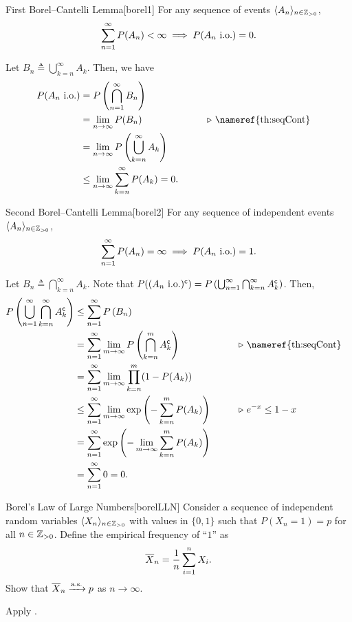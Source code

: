 \documentclass[../probability.tex]{subfiles}
\begin{document}
\begin{Theorem}{First Borel--Cantelli Lemma}[borel1]
    For any sequence of events \(\lang A_n \rang_{n \in \ZZ_{>0}}\),
    \[
        \sum_{n=1}^\infty P(A_n) < \infty
        \implies P(A_n\text{ i.o.}) = 0\text.
    \]
\end{Theorem}
\begin{myproof}[Proof]
    Let \(B_n \triangleq \bigcup_{k=n}^\infty A_k\).
    Then, we have
    \begin{alignat*}{2}
        P(A_n\text{ i.o.})
        &= P \left( \bigcap_{n=1}^\infty B_n \right) \\
        &= \lim_{n\to\infty} P(B_n) &\qquad& \comment{\nameref{th:seqCont}} \\
        &= \lim_{n \to \infty} P \left( \bigcup_{k=n}^\infty A_k\right) \\
        &\le \lim_{n \to \infty} \sum_{k=n}^\infty P(A_k) = 0\text.
    \end{alignat*}
\end{myproof}

\begin{Theorem}{Second Borel--Cantelli Lemma}[borel2]
    For any sequence of independent events \(\lang A_n \rang_{n \in \ZZ_{>0}}\),
    \[
        \sum_{n=1}^\infty P(A_n) = \infty
        \implies P(A_n\text{ i.o.}) = 1\text.
    \]
\end{Theorem}
\begin{myproof}[Proof]
    Let \(B_n \triangleq \bigcap_{k=n}^\infty A_k\).
    Note that \(P((A_n\text{ i.o.})^{\mathsf{c}}) = P \left( \bigcup_{n=1}^\infty \bigcap_{k=n}^\infty
    A_k^{\mathsf{c}} \right)\).
    Then,
    \begin{alignat*}{2}
        P \left( \bigcup_{n=1}^\infty \bigcap_{k=n}^\infty A_k^\cmpl \right)
        &\le \sum_{n=1}^\infty P \left( B_n \right) &\qquad \\
        &= \sum_{n=1}^\infty \lim_{m \to \infty} P \left( \bigcap_{k=n}^m A_k^\cmpl \right) && \comment{\nameref{th:seqCont}} \\
        &= \sum_{n=1}^\infty \lim_{m \to \infty} \prod_{k=n}^m (1-P(A_k)) \\
        &\le \sum_{n=1}^\infty \lim_{m \to \infty} \exp \left( -\sum_{k=n}^m P(A_k) \right) && \comment{\(e^{-x} \le 1-x\)} \\
        &= \sum_{n=1}^\infty \exp \left( -\lim_{m \to \infty} \sum_{k=n}^m P(A_k) \right) \\
        &= \sum_{n=1}^\infty 0 = 0\text.
    \end{alignat*}
\end{myproof}

\begin{Exercise}{Borel's Law of Large Numbers}[borelLLN]
    Consider a sequence of independent random variables \(\lang X_n \rang_{n \in \ZZ_{>0}}\)
    with values in \(\{0,1\}\)
    such that \(P(X_n = 1) = p\) for all \(n \in \ZZ_{>0}\).
    Define the empirical frequency of ``\(1\)'' as
    \[
        \overline{X}_n = \frac{1}{n}\sum_{i=1}^n X_i\text.
    \]
    Show that \(\overline{X}_n \xrightarrow{\mathrm{a.s.}} p\) as \(n \to \infty\).
\end{Exercise}
\begin{solution}
    Apply .
\end{solution}
\end{document}
